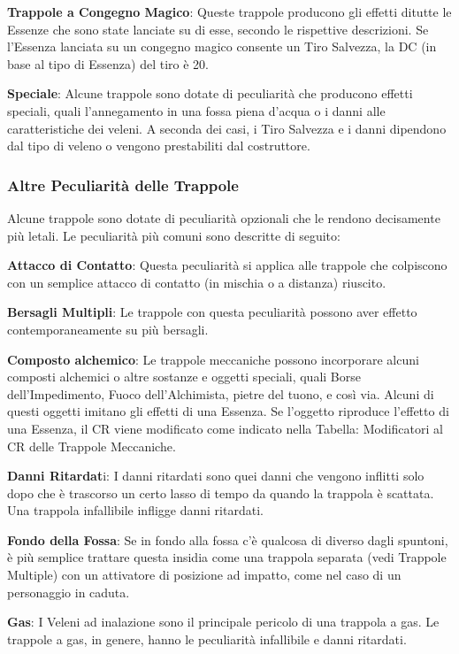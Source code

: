 \documentclass[a4paper,11pt,twoside,openany]{book}
\begin{document}
\textbf{Trappole a Congegno Magico}: Queste trappole producono gli effetti ditutte le Essenze che sono state lanciate su di esse, secondo le rispettive descrizioni. Se l'Essenza lanciata su un congegno magico consente un Tiro Salvezza, la DC (in base al tipo di Essenza) del tiro è 20.

\textbf{Speciale}: Alcune trappole sono dotate di peculiarità che producono effetti speciali, quali l'annegamento in una fossa piena d'acqua o i danni alle caratteristiche dei veleni. A seconda dei casi, i Tiro Salvezza e i danni dipendono dal tipo di veleno o vengono prestabiliti dal costruttore.

\subsubsection{Altre Peculiarità delle Trappole}

Alcune trappole sono dotate di peculiarità opzionali che le rendono decisamente più letali. Le peculiarità più comuni sono descritte di seguito:

\textbf{Attacco di Contatto}: Questa peculiarità si applica alle trappole che colpiscono con un semplice attacco di contatto (in mischia o a distanza) riuscito.

\textbf{Bersagli Multipli}: Le trappole con questa peculiarità possono aver effetto contemporaneamente su più bersagli.

\textbf{Composto alchemico}: Le trappole meccaniche possono incorporare alcuni composti alchemici o altre sostanze e oggetti speciali, quali Borse dell'Impedimento, Fuoco dell'Alchimista, pietre del tuono, e così via. Alcuni di questi oggetti imitano gli effetti di una Essenza. Se l'oggetto riproduce l'effetto di una Essenza, il CR viene modificato come indicato nella Tabella: Modificatori al CR delle Trappole Meccaniche.

\textbf{Danni Ritardat}i: I danni ritardati sono quei danni che vengono inflitti solo dopo che è trascorso un certo lasso di tempo da quando la trappola è scattata. Una trappola infallibile infligge danni ritardati.

\textbf{Fondo della Fossa}: Se in fondo alla fossa c'è qualcosa di diverso dagli spuntoni, è più semplice trattare questa insidia come una trappola separata (vedi Trappole Multiple) con un attivatore di posizione ad impatto, come nel caso di un personaggio in caduta.

\textbf{Gas}: I Veleni ad inalazione sono il principale pericolo di una trappola a gas. Le trappole a gas, in genere, hanno le peculiarità infallibile e danni ritardati.
\end{document}
